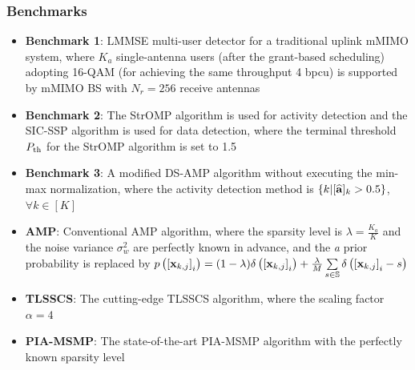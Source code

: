 \documentclass[9pt]{beamer}
\let \it = \textit
\begin{document}
\begin{frame}
\frametitle{Benchmarks}
\begin{itemize}
\item
{\bf Benchmark 1}: LMMSE multi-user detector for a traditional uplink mMIMO system, where $K_a$ single-antenna users (after the grant-based scheduling) adopting 16-QAM (for achieving the same throughput 4 bpcu) is supported by mMIMO BS with $N_r=256$ receive antennas
\item
{\bf Benchmark 2}: The StrOMP algorithm is used for activity detection and the SIC-SSP algorithm is used for data detection, where the terminal threshold $P_{\rm th}$ for the StrOMP algorithm is set to 1.5
\item
{\bf Benchmark 3}: A modified DS-AMP algorithm without executing the min-max normalization, where the activity detection method is $\{k|[\widehat{\bf a}]_k>0.5\}$, $\forall k\in[K]$
\item
{\bf AMP}: Conventional AMP algorithm, where the sparsity level is $\lambda=\frac{K_a}{K}$ and the noise variance $\sigma_w^2$ are perfectly known in advance, and the {\it a prior} probability is replaced by $p\left({\left[{{\bf x}_{k,j}}\right]_i}\right)=(1-\lambda)\delta\left({\left[{{\bf x}_{k,j}}\right]_i}\right)+\frac{\lambda}{M}\sum\limits_{s\in\mathbb{S}}\delta\left({\left[{{\bf x}_{k,j}}\right]_i-s}\right)$
\item
{\bf TLSSCS}: The cutting-edge TLSSCS algorithm, where the scaling factor $\alpha=4$
\item
{\bf PIA-MSMP}: The state-of-the-art PIA-MSMP algorithm with the perfectly known sparsity level
\end{itemize}
\end{frame}
\end{document}
